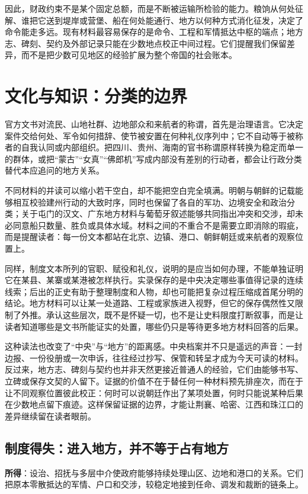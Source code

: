 因此，财政约束不是某个固定总额，而是不断被运输所检验的能力。粮饷从何处征解、谁把它送到堤岸或营堡、船在何处能通行、地方以何种方式消化征发，决定了命令能走多远。现有材料最容易保存的是命令、工程和军情抵达中枢的端点；地方志、碑刻、契约及外部记录只能在少数地点校正中间过程。它们提醒我们保留差异，而不是把少数可见地区的经验扩展为整个帝国的社会账本。

\section{文化与知识：分类的边界}

官方文书对流民、山地社群、边地部众和来航者的称谓，首先是治理语言。它决定案件交给何处、军令如何措辞、使节被安置在何种礼仪序列中；它不自动等于被称者的自我认同或内部组织。把四川、贵州、海南的官书称谓原样转换为稳定而单一的群体，或把“蒙古”“女真”“佛郎机”写成内部没有差别的行动者，都会让行政分类替代本应追问的地方关系。

不同材料的并读可以缩小若干空白，却不能把空白完全填满。明朝与朝鲜的记载能够相互校验建州行动的大致时序，同时也保留了各自的军功、边境安全和政治分类；关于屯门的汉文、广东地方材料与葡萄牙叙述能够共同指出冲突和交涉，却未必同意船只数量、胜负或具体水域。材料之间的不重合不是需要立即消除的瑕疵，而是提醒读者：每一份文本都站在北京、边镇、港口、朝鲜朝廷或来航者的观察位置上。

同样，制度文本所列的官职、赋役和礼仪，说明的是应当如何办理，不能单独证明它在某县、某寨或某港被怎样执行。实录保存的是中央决定哪些事值得记录的连续线索；后出的正史有助于整理制度和人物，却也可能把复杂过程压缩成首尾分明的结论。地方材料可以让某一处道路、工程或家族进入视野，但它的保存偶然性又限制了外推。承认这些层次，既不是怀疑一切，也不是让史料限度打断叙事，而是让读者知道哪些是文书所能证实的处置，哪些仍只是等待更多地方材料回答的后果。

这种读法也改变了“中央”与“地方”的距离感。中央档案并不只是遥远的声音：一封边报、一份役册或一次申诉，往往经过抄写、保管和转呈才成为今天可读的材料。反过来，地方志、碑刻与契约也并非天然更接近普通人的经验，它们由能够书写、立碑或保存文契的人留下。证据的价值不在于替任何一种材料预先排座次，而在于让不同观察位置彼此校正：何时可以说朝廷作出了某项处置，何时只能说某种后果在少数地点留下痕迹。这样保留证据的边界，才能让荆襄、哈密、江西和珠江口的差异继续留在读者眼前。

\subsection{制度得失：进入地方，并不等于占有地方}
\textbf{所得}：设治、招抚与多层中介使政府能够持续处理山区、边地和港口的关系。它们把原本零散抵达的军情、户口和交涉，较稳定地接到任命、调发和裁断的链条上。

